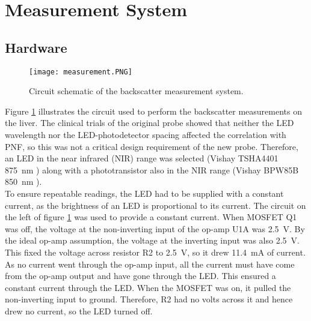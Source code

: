 \section{Measurement System}
\subsection{Hardware}

\begin{figure}[htb]
	\centering
	\texttt{[image: measurement.PNG]}
	\caption{Circuit schematic of the backscatter measurement system.}
	\label{fig: measurement schematic}
\end{figure}

Figure \ref{fig: measurement schematic} illustrates the circuit used to perform the backscatter measurements on the liver. The clinical trials of the original probe showed that neither the LED wavelength nor the LED-photodetector spacing affected the correlation with PNF, so this was not a critical design requirement of the new probe. Therefore, an LED in the near infrared (NIR) range was selected (Vishay TSHA4401 \SI{875}{\nano\metre} \cite{tsha4401}) along with a phototransistor also in the NIR range (Vishay BPW85B \SI{850}{\nano\metre} \cite{bpw85b}).\\

To ensure repeatable readings, the LED had to be supplied with a constant current, as the brightness of an LED is proportional to its current. The circuit on the left of figure \ref{fig: measurement schematic} was used to provide a constant current. When MOSFET Q1 was off, the voltage at the non-inverting input of the op-amp U1A was \SI{2.5}{\volt}. By the ideal op-amp assumption, the voltage at the inverting input was also \SI{2.5}{\volt}. This fixed the voltage across resistor R2 to \SI{2.5}{\volt}, so it drew \SI{11.4}{\milli\ampere} of current. As no current went through the op-amp input, all the current must have come from the op-amp output and have gone through the LED.  This ensured a constant current through the LED. When the MOSFET was on, it pulled the non-inverting input to ground. Therefore, R2 had no volts across it and hence drew no current, so the LED turned off.\\

